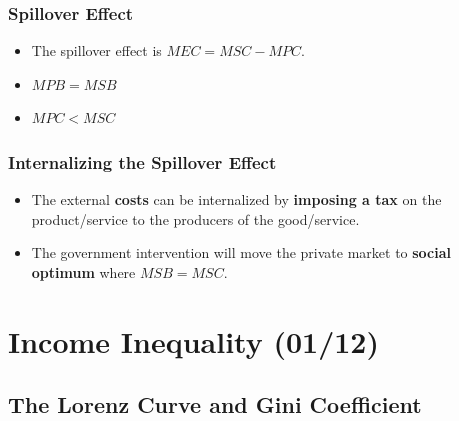 \documentclass[
  letterpaper,
  DIV=11,
  numbers=noendperiod]{scrartcl}
\providecommand{\tightlist}{%
  \setlength{\itemsep}{0pt}\setlength{\parskip}{0pt}}\usepackage{longtable,booktabs,array}
\begin{document}
\subsubsection{Spillover Effect}\label{spillover-effect-3}

\begin{itemize}
\tightlist
\item
  The spillover effect is \(MEC = MSC-MPC\).
\item
  \(MPB = MSB\)
\item
  \(MPC < MSC\)
\end{itemize}

\subsubsection{Internalizing the Spillover
Effect}\label{internalizing-the-spillover-effect-3}

\begin{itemize}
\tightlist
\item
  The external \textbf{costs} can be internalized by \textbf{imposing a
  tax} on the product/service to the producers of the good/service.
\item
  The government intervention will move the private market to
  \textbf{social optimum} where \(MSB = MSC\).
\end{itemize}

\newpage{}

\section{Income Inequality (01/12)}\label{income-inequality-0112}

\subsection{The Lorenz Curve and Gini
Coefficient}\label{the-lorenz-curve-and-gini-coefficient}
\end{document}
